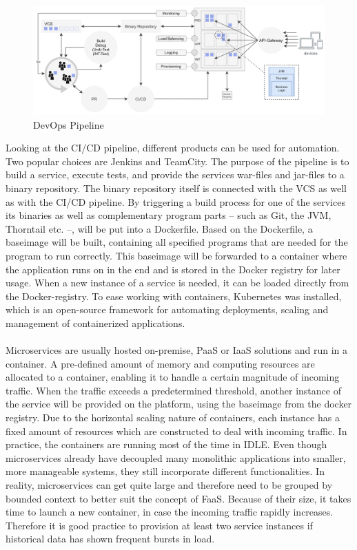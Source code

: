 \documentclass[11pt]{article}
\begin{document}
\begin{figure}[H]
\caption{DevOps Pipeline}
\label{fig:devopsone}
\centering
\includegraphics[width=1\textwidth]{devopsone}
\end{figure}
Looking at the CI/CD pipeline, different products can be used for automation. Two popular choices are Jenkins and TeamCity. The purpose of the pipeline is to build a service, execute tests, and provide the services war-files and jar-files to a binary repository. The binary repository itself is connected with the VCS as well as with the CI/CD pipeline. By triggering a build process for one of the services its binaries as well as complementary program parts -- such as Git, the JVM, Thorntail etc. --, will be put into a Dockerfile. Based on the Dockerfile, a baseimage will be built, containing all specified programs that are needed for the program to run correctly. This baseimage will be forwarded to a container where the application runs on in the end and is stored in the Docker registry for later usage. When a new instance of a service is needed, it can be loaded directly from the Docker-registry. To ease working with containers, Kubernetes was installed, which is an open-source framework for automating deployments, scaling and management of containerized applications.\\\\ Microservices are usually hosted on-premise, PaaS or IaaS solutions and run in a container. A pre-defined amount of memory and computing resources are allocated to a container, enabling it to handle a certain magnitude of incoming traffic. When the traffic exceeds a predetermined threshold, another instance of the service will be provided on the platform, using the baseimage from the docker registry. Due to the horizontal scaling nature of containers, each instance has a fixed amount of resources which are constructed to deal with incoming traffic.  In practice, the containers are running most of the time in IDLE. Even though microservices already have decoupled many monolithic applications into smaller, more manageable systems, they still incorporate different functionalities. In reality, microservices can get quite large and therefore need to be grouped by bounded context to better suit the concept of FaaS. Because of their size, it takes time to launch a new container, in case the incoming traffic rapidly increases. Therefore it is good practice to provision at least two service instances if historical data has shown frequent bursts in load. 
\end{document}
